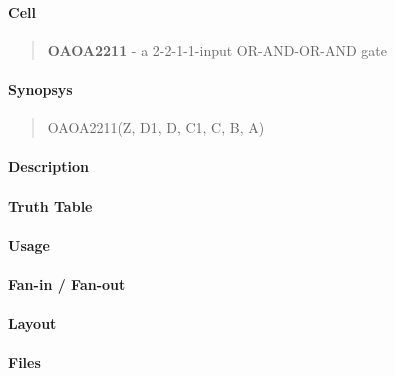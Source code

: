 \label{OAOA2211}
\paragraph{Cell}
\begin{quote}
    \textbf{OAOA2211} - a 2-2-1-1-input OR-AND-OR-AND gate
\end{quote}

\paragraph{Synopsys}
\begin{quote}
    OAOA2211(Z, D1, D, C1, C, B, A)
\end{quote}

\paragraph{Description}

%

\paragraph{Truth Table}
%

\paragraph{Usage}

\paragraph{Fan-in / Fan-out}

\paragraph{Layout}

\paragraph{Files}
